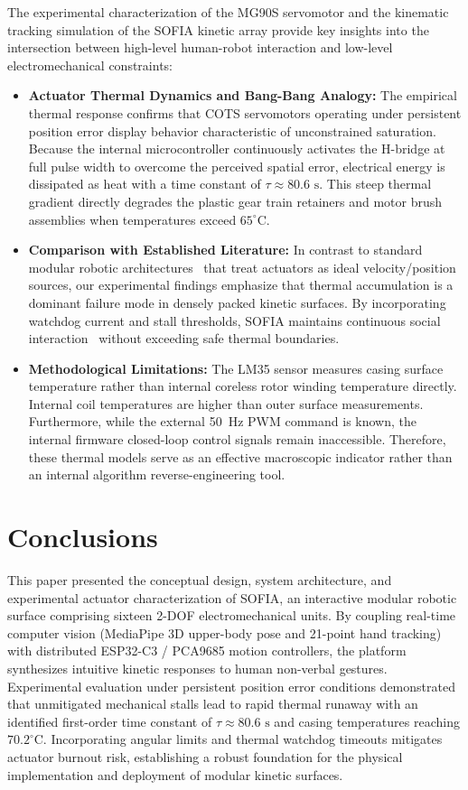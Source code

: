 \documentclass[lettersize,journal]{IEEEtran}
\begin{document}
The experimental characterization of the MG90S servomotor and the kinematic tracking simulation of the SOFIA kinetic array provide key insights into the intersection between high-level human-robot interaction and low-level electromechanical constraints:
\begin{itemize}
\item \textbf{Actuator Thermal Dynamics and Bang-Bang Analogy:} The empirical thermal response confirms that COTS servomotors operating under persistent position error display behavior characteristic of unconstrained saturation. Because the internal microcontroller continuously activates the H-bridge at full pulse width to overcome the perceived spatial error, electrical energy is dissipated as heat with a time constant of $\tau \approx 80.6\text{ s}$. This steep thermal gradient directly degrades the plastic gear train retainers and motor brush assemblies when temperatures exceed $65^\circ\text{C}$.
\item \textbf{Comparison with Established Literature:} In contrast to standard modular robotic architectures~\cite{seo2019modular} that treat actuators as ideal velocity/position sources, our experimental findings emphasize that thermal accumulation is a dominant failure mode in densely packed kinetic surfaces. By incorporating watchdog current and stall thresholds, SOFIA maintains continuous social interaction~\cite{fong2003social} without exceeding safe thermal boundaries.
\item \textbf{Methodological Limitations:} The LM35 sensor measures casing surface temperature rather than internal coreless rotor winding temperature directly. Internal coil temperatures are higher than outer surface measurements. Furthermore, while the external 50~Hz PWM command is known, the internal firmware closed-loop control signals remain inaccessible. Therefore, these thermal models serve as an effective macroscopic indicator rather than an internal algorithm reverse-engineering tool.
\end{itemize}

\section{Conclusions}
\label{sec:conclusions}

This paper presented the conceptual design, system architecture, and experimental actuator characterization of SOFIA, an interactive modular robotic surface comprising sixteen 2-DOF electromechanical units. By coupling real-time computer vision (MediaPipe 3D upper-body pose and 21-point hand tracking) with distributed ESP32-C3 / PCA9685 motion controllers, the platform synthesizes intuitive kinetic responses to human non-verbal gestures. Experimental evaluation under persistent position error conditions demonstrated that unmitigated mechanical stalls lead to rapid thermal runaway with an identified first-order time constant of $\tau \approx 80.6\text{ s}$ and casing temperatures reaching $70.2^\circ\text{C}$. Incorporating angular limits and thermal watchdog timeouts mitigates actuator burnout risk, establishing a robust foundation for the physical implementation and deployment of modular kinetic surfaces.
\end{document}
